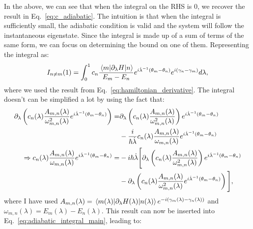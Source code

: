     In the above, we can see that when the integral on the RHS is 0, we recover the result in Eq.~\eqref{eq:c_adiabatic}. The intuition is that when the integral is sufficiently small, the adiabatic condition is valid and the system will follow the instantaneous eigenstate. Since the integral is made up of a sum of terms of the same form, we can focus on determining the bound on one of them. Representing the integral as:
    \begin{equation}\label{eq:adiabatic_integral_main}
        I_{n \neq m}(1) = \int_0^1 c_n \frac{\mel{m}{\partial_{\lambda}H}{n}}{E_m - E_n} e^{i\dot{\lambda}^{-1}(\theta_m - \theta_n)} e^{i(\gamma_n - \gamma_m)} d \lambda,
    \end{equation}
    where we used the result from Eq.~\eqref{eq:hamiltonian_derivative}. The integral doesn't can be simplified a lot by using the fact that:
    \begin{equation}
        \begin{aligned}\label{eq:simplifying_adiabatic_integral}
            \partial_{\lambda} \left( c_n(\lambda) \frac{A_{m,n}(\lambda)}{\omega_{m,n}^2(\lambda)}e^{i\dot{\lambda}^{-1}(\theta_m - \theta_n)} \right) = &\partial_{\lambda} \left( c_n(\lambda) \frac{A_{m,n}(\lambda)}{\omega_{m,n}^2(\lambda)}\right) e^{i\dot{\lambda}^{-1}(\theta_m - \theta_n)} \\ &- \frac{i}{\hbar \dot{\lambda}} c_n(\lambda) \frac{A_{m,n}(\lambda)}{\omega_{m,n}(\lambda)}e^{i\dot{\lambda}^{-1}(\theta_m - \theta_n)} \\ 
            \Rightarrow c_n(\lambda) \frac{A_{m,n}(\lambda)}{\omega_{m,n}(\lambda)}e^{i\dot{\lambda}^{-1}(\theta_m - \theta_n)} = &-i\hbar\dot{\lambda} \Bigg[ \partial_{\lambda} \left(c_n(\lambda) \frac{A_{m,n}(\lambda)}{\omega_{m,n}^2(\lambda)} \right) e^{i\dot{\lambda}^{-1}(\theta_m - \theta_n)} \\
            &- \partial_{\lambda} \left( c_n(\lambda) \frac{A_{m,n}(\lambda)}{\omega_{m,n}^2(\lambda)}e^{i\dot{\lambda}^{-1}(\theta_m - \theta_n)} \right) \Bigg],
        \end{aligned}
    \end{equation}
    where I have used $A_{m,n}(\lambda) = \mel{m(\lambda)}{\partial_{\lambda}H(\lambda)}{n(\lambda)}e^{-i(\gamma_m(\lambda) - \gamma_n(\lambda))}$ and $\omega_{m,n}(\lambda) = E_m(\lambda) - E_n(\lambda)$. This result can now be inserted into Eq.~\eqref{eq:adiabatic_integral_main}, leading to:
